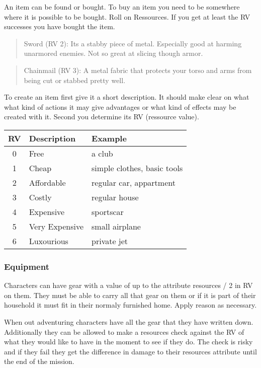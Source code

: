 \documentclass[11pt]{article}
\begin{document}
{\begin{multicols}{2}[]
An item can be found or bought. To buy an item you need to be somewhere where it is possible to be bought. Roll on Ressources. If you get at least the RV successes you have bought the item.

\begin{quote}
Sword (RV 2):
Its a stabby piece of metal. Especially good at harming unarmored enemies. Not so great at slicing though armor. 
\end{quote}

\begin{quote}
Chainmail (RV 3):
A metal fabric that protects your torso and arms from being cut or stabbed pretty well. 
\end{quote}

To create an item first give it a short description. It should make clear on what what kind of actions it may give advantages or what kind of effects may be created with it. Second you determine its RV (ressource value).

\begin{center}
\begin{tabular}{c|l|l}
\textbf{RV} & \textbf{Description} & \textbf{Example}\\
\hline
0 & Free & a club\\
1 & Cheap & simple clothes, basic tools\\
2 & Affordable & regular car, appartment\\
3 & Costly & regular house\\
4 & Expensive & sportscar\\
5 & Very Expensive & small airplane\\
6 & Luxourious & private jet\\
\end{tabular}
\end{center}


\subsubsection{Equipment}
\label{sec:org71a3b74}
Characters can have gear with a value of up to the attribute resources / 2 in RV on them. They must be able to carry all that gear on them or if it is part of their household it must fit in their normaly furnished home. Apply reason as necessary.

When out adventuring characters have all the gear that they have written down. Additionally they can be allowed to make a resources check against the RV of what they would like to have in the moment to see if they do. The check is risky and if they fail they get the difference in damage to their resources attribute until the end of the mission.


\end{multicols}}
\end{document}
